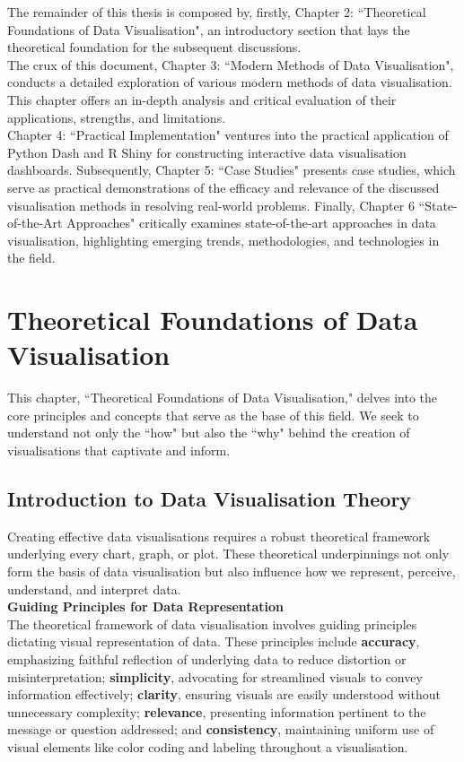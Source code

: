 \documentclass{article}\usepackage[]{graphicx}\usepackage[]{xcolor}
\begin{document}
The remainder of this thesis is composed by, firstly, Chapter 2: ``Theoretical Foundations of Data Visualisation", an introductory section that lays the theoretical foundation for the subsequent discussions.\\

\noindent 
The crux of this document, Chapter 3: ``Modern Methods of Data Visualisation", conducts a detailed exploration of various modern methods of data visualisation. This chapter offers an in-depth analysis and critical evaluation of their applications, strengths, and limitations.\\

\noindent 
Chapter 4: ``Practical Implementation" ventures into the practical application of Python Dash and R Shiny for constructing interactive data visualisation dashboards. Subsequently, Chapter 5: ``Case Studies" presents case studies, which serve as practical demonstrations of the efficacy and relevance of the discussed visualisation methods in resolving real-world problems. Finally, Chapter 6 ``State-of-the-Art Approaches" critically examines state-of-the-art approaches in data visualisation, highlighting emerging trends, methodologies, and technologies in the field.

\newpage 


\section{Theoretical Foundations of Data Visualisation}
This chapter, ``Theoretical Foundations of Data Visualisation," delves into the core principles and concepts that serve as the base of this field. We seek to understand not only the ``how" but also the ``why" behind the creation of visualisations that captivate and inform.

\subsection{Introduction to Data Visualisation Theory}
Creating effective data visualisations requires a robust theoretical framework underlying every chart, graph, or plot. These theoretical underpinnings not only form the basis of data visualisation but also influence how we represent, perceive, understand, and interpret data.\\ 

\noindent \textbf{Guiding Principles for Data Representation}\\
The theoretical framework of data visualisation involves guiding principles dictating visual representation of data. These principles include \textbf{accuracy}, emphasizing faithful reflection of underlying data to reduce distortion or misinterpretation; \textbf{simplicity}, advocating for streamlined visuals to convey information effectively; \textbf{clarity}, ensuring visuals are easily understood without unnecessary complexity; \textbf{relevance}, presenting information pertinent to the message or question addressed; and \textbf{consistency}, maintaining uniform use of visual elements like color coding and labeling throughout a visualisation.\\
\end{document}
